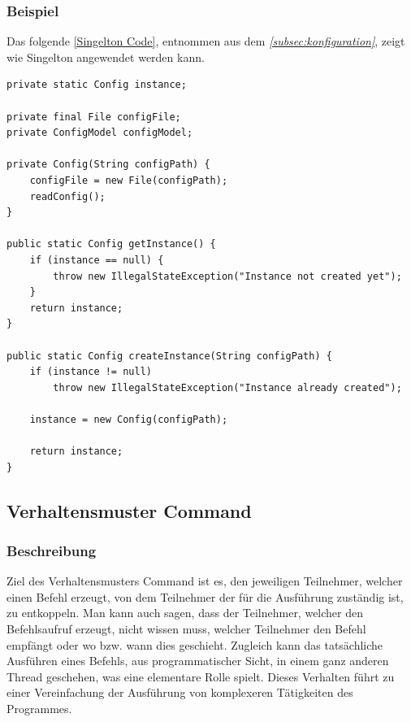 \subsubsection{Beispiel}
Das folgende \autoref{Singelton Code}, entnommen aus dem \textit{\autoref{subsec:konfiguration}}, zeigt wie Singelton angewendet werden kann.
\begin{lstlisting}[style=java,caption=Singelton-Codebeispiel,label=Singelton Code]
private static Config instance;

private final File configFile;
private ConfigModel configModel;

private Config(String configPath) {
    configFile = new File(configPath);
    readConfig();
}

public static Config getInstance() {
    if (instance == null) {
        throw new IllegalStateException("Instance not created yet");
    }
    return instance;
}

public static Config createInstance(String configPath) {
    if (instance != null)
        throw new IllegalStateException("Instance already created");

    instance = new Config(configPath);

    return instance;
}
\end{lstlisting}
\subsection{Verhaltensmuster Command}\label{subsec:verhaltensmuster-command}
\subsubsection{Beschreibung}
Ziel des Verhaltensmusters Command ist es, den jeweiligen Teilnehmer, welcher einen Befehl erzeugt, von dem Teilnehmer der für die Ausführung zuständig ist, zu entkoppeln.
Man kann auch sagen, dass der Teilnehmer, welcher den Befehlsaufruf erzeugt, nicht wissen muss, welcher Teilnehmer den Befehl empfängt oder wo bzw. wann dies geschieht.
Zugleich kann das tatsächliche Ausführen eines Befehls, aus programmatischer Sicht, in einem ganz anderen Thread geschehen, was eine elementare Rolle spielt.
Dieses Verhalten führt zu einer Vereinfachung der Ausführung von komplexeren Tätigkeiten des Programmes.

